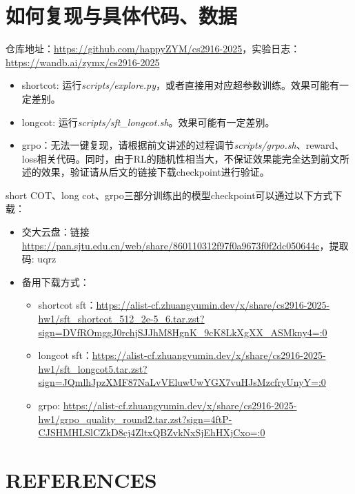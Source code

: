\documentclass[12pt,hyperref,a4paper,UTF8]{ctexart}
\begin{document}
	\newpage
	\appendix
	\section{如何复现与具体代码、数据}
	仓库地址：\url{https://github.com/happyZYM/cs2916-2025}，实验日志：\url{https://wandb.ai/zymx/cs2916-2025}
	\begin{itemize}
		\item shortcot: 运行\textit{scripts/explore.py}，或者直接用对应超参数训练。效果可能有一定差别。
		\item longcot: 运行\textit{scripts/sft\_longcot.sh}。效果可能有一定差别。
		\item grpo：无法一键复现，请根据前文讲述的过程调节\textit{scripts/grpo.sh}、reward、loss相关代码。同时，由于RL的随机性相当大，不保证效果能完全达到前文所述的效果，验证请从后文的链接下载checkpoint进行验证。
	\end{itemize}
	short COT、long cot、grpo三部分训练出的模型checkpoint可以通过以下方式下载：

	\begin{itemize}
		\item 交大云盘：链接\url{https://pan.sjtu.edu.cn/web/share/860110312f97f0a9673f0f2dc050644c}，提取码: uqrz
		\item 备用下载方式：
		\begin{itemize}
			\item shortcot sft：\url{https://alist-cf.zhuangyumin.dev/x/share/cs2916-2025-hw1/sft_shortcot_512_2e-5_6.tar.zst?sign=DVfROmggJ0rchjSJJhM8HgnK_9cK8LkXgXX_ASMkny4=:0}
			\item longcot sft：\url{https://alist-cf.zhuangyumin.dev/x/share/cs2916-2025-hw1/sft_longcot5.tar.zst?sign=JQmlhJpzXMF87NaLvVEluwUwYGX7vuHJsMzcfryUnyY=:0}
			\item grpo: \url{https://alist-cf.zhuangyumin.dev/x/share/cs2916-2025-hw1/grpo_quality_round2.tar.zst?sign=4ftP-CJSHMHLSlCZkD8cj4ZltxQBZvkNxSjEhHXjCxo=:0}
		\end{itemize}
	\end{itemize}
	\section{REFERENCES}
	\nocite{*}
	\printbibliography[heading=none]
	
	
\end{document}
